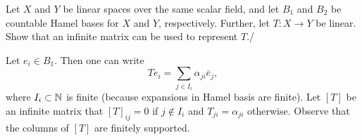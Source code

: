 \begin{problem}
	Let $ X $ and $ Y $ be linear spaces over the same scalar field, and let $ B_1 $ and $ B_2 $ be countable Hamel bases for $ X $ and $ Y $, respectively. Further, let $ T:X\to Y $ be linear. Show that an infinite matrix can be used to represent $ T $./
\end{problem}
\begin{solution}
	Let $ e_i \in B_1 $. Then one can write
	\[ Te_i = \sum_{j\in I_i} \alpha_{ji} \bar{e}_j, \]
	where $ I_i \subset \mathbb{N} $ is finite (because expansions in Hamel basis are finite).
	Let $ [T] $ be an infinite matrix that $ [T]_{ij} = 0 $ if $ j\notin I_i $ and $ T_{ji}= \alpha_{ji} $ otherwise. Observe that the columns of $ [T] $ are finitely supported. 
\end{solution}


